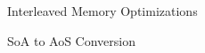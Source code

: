 
\begin{frame}{Interleaved Memory Optimizations}

\end{frame}


\begin{frame}{SoA to AoS Conversion}

\end{frame}
